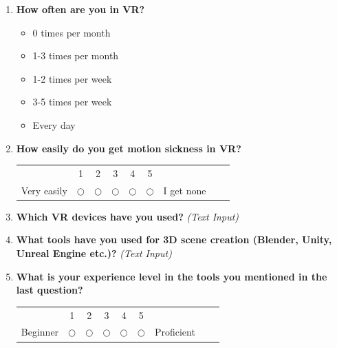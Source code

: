 \documentclass[inscr,ack,preface]{dithesis}
\begin{document}
\begin{appendix}
\begin{enumerate}
    \item \textbf{How often are you in VR?}
          \begin{itemize}
            \item 0 times per month
            \item 1-3 times per month
            \item 1-2 times per week
            \item 3-5 times per week
            \item Every day
          \end{itemize}

    \item \begin{minipage}[t]{\linewidth}
            \textbf{How easily do you get motion sickness in VR?}
            \begin{center}
              \small
              \renewcommand{\arraystretch}{1.5}
              \begin{tabular}{ccccccccc}
                            & 1          & 2          & 3          & 4          & 5          &            \\
                Very easily & $\bigcirc$ & $\bigcirc$ & $\bigcirc$ & $\bigcirc$ & $\bigcirc$ & I get none
              \end{tabular}
            \end{center}
          \end{minipage}

    \item \textbf{Which VR devices have you used?}
          \textit{(Text Input)}

    \item \textbf{What tools have you used for 3D scene creation (Blender, Unity, Unreal Engine etc.)?}
          \textit{(Text Input)}

    \item \begin{minipage}[t]{\linewidth}
            \textbf{What is your experience level in the tools you mentioned in the last question?}
            \begin{center}
              \small
              \renewcommand{\arraystretch}{1.5}
              \begin{tabular}{ccccccccc}
                         & 1          & 2          & 3          & 4          & 5          &            \\
                Beginner & $\bigcirc$ & $\bigcirc$ & $\bigcirc$ & $\bigcirc$ & $\bigcirc$ & Proficient
              \end{tabular}
            \end{center}
          \end{minipage}


\end{enumerate}
\end{appendix}
\end{document}
